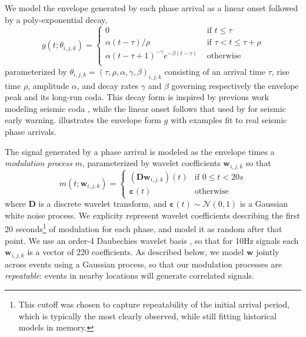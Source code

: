 \documentclass[twoside]{article} \usepackage{aistats2017}
\newcommand{\N}{\mathcal{N}}
\renewcommand{\v}[1]{\mathbf{#1}}
\newcommand{\ve}{\v{\varepsilon}}
\begin{document}
We model the envelope generated by each phase
arrival as a linear onset followed by a poly-exponential decay, 
\begin{equation}g(t; \theta_{i,j,k}) = \left\{\begin{array}{ll}
0 & \text{ if } t \le \tau\\
\alpha (t-\tau) / \rho & \text{ if } \tau < t \le \tau+\rho\\
\alpha (t-\tau+1)^{-\gamma} e^{-\beta (t-\tau)} &\text{ otherwise}\\
\end{array}\right.\end{equation}
parameterized by $\theta_{i,j,k} = (\tau, \rho, \alpha, \gamma,
\beta)_{i,j,k}$ consisting of an arrival time $\tau$, rise time $\rho$, amplitude
$\alpha$, and decay rates $\gamma$ and $\beta$ governing respectively
the envelope peak and its long-run coda. This decay form is inspired by previous work modeling seismic
coda \citep{mayeda2003stable}, while the linear
onset follows that used by 
\citet{cua2005creating} for seismic early warning.  illustrates the envelope
form $g$ with examples fit to real seismic phase arrivals.

The signal generated by a phase arrival is modeled
as the envelope times a {\em modulation process} $m$, parameterized
by wavelet coefficients $\v{w}_{i,j,k}$ so that
\begin{equation}
m(t; \v{w}_{i,j,k}) = \left\{\begin{array}{ll} (\mathbf{D}\v{w}_{i,j,k})(t) & \text{if } 0 \le t <
                                                    20s\\\ve(t) & \text{otherwise}\end{array}\right.\end{equation}
where $\mathbf{D}$ is a discrete wavelet transform, and
$\ve(t)\sim\N(0, 1)$ is a Gaussian white noise process. We
explicity represent wavelet coefficients describing the first 20
seconds\footnote{This cutoff was chosen to
  capture repeatability of the initial arrival period, which is
  typically the most clearly observed, while still fitting historical
  models in memory.} of modulation for each 
phase, and model it as random after that point. We use an order-4 Daubechies wavelet
basis \citep{daubechies1992ten}, so that for 10Hz signals each
$\v{w}_{i,j,k}$ is a vector of 220 coefficients.  As described below, we
model $\v{w}$ jointly across events using a Gaussian process, so that
our modulation processes are {\em repeatable}: events in nearby locations
will generate correlated signals. 
\end{document}
